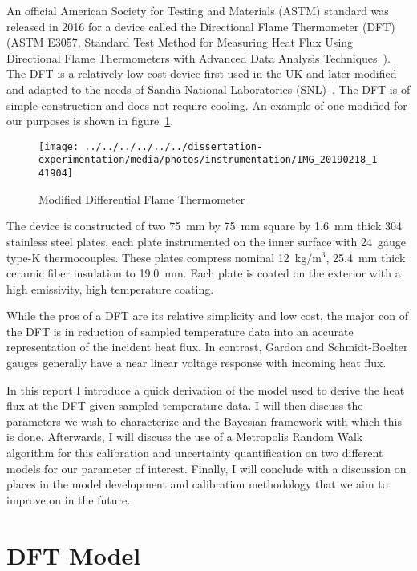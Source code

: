 \documentclass[article]{proc}
\begin{document}
    An official American Society for Testing and Materials (ASTM) standard was released in 2016 for a device called the Directional Flame Thermometer (DFT) (ASTM E3057, Standard Test Method for Measuring Heat Flux Using Directional Flame Thermometers with Advanced Data Analysis Techniques~\cite{astm:3057}). The DFT is a relatively low cost device first used in the UK and later modified and adapted to the needs of Sandia National Laboratories (SNL)~\cite{Fry:1989,Nakos:2018}. The DFT is of simple construction and does not require cooling. An example of one modified for our purposes is shown in figure~\ref{fig:dft}. 

    \begin{figure}[h!]
        \centering
        \texttt{[image: ../../../../../../dissertation-experimentation/media/photos/instrumentation/IMG\_20190218\_141904]}
        \caption{Modified Differential Flame Thermometer}
        \label{fig:dft}
    \end{figure}

    The device is constructed of two 75~mm by 75~mm square by 1.6~mm thick 304 stainless steel plates, each plate instrumented on the inner surface with 24~gauge type-K thermocouples. These plates compress nominal 12~kg/m$^3$, 25.4~mm thick ceramic fiber insulation to 19.0~mm. Each plate is coated on the exterior with a high emissivity, high temperature coating. 

    While the pros of a DFT are its relative simplicity and low cost, the major con of the DFT is in reduction of sampled temperature data into an accurate representation of the incident heat flux. In contrast, Gardon and Schmidt-Boelter gauges generally have a near linear voltage response with incoming heat flux.

    In this report I introduce a quick derivation of the model used to derive the heat flux at the DFT given sampled temperature data. I will then discuss the parameters we wish to characterize and the Bayesian framework with which this is done. Afterwards, I will discuss the use of a Metropolis Random Walk algorithm for this calibration and uncertainty quantification on two different models for our parameter of interest. Finally, I will conclude with a discussion on places in the model development and calibration methodology that we aim to improve on in the future.

\section{DFT Model}
\end{document}
